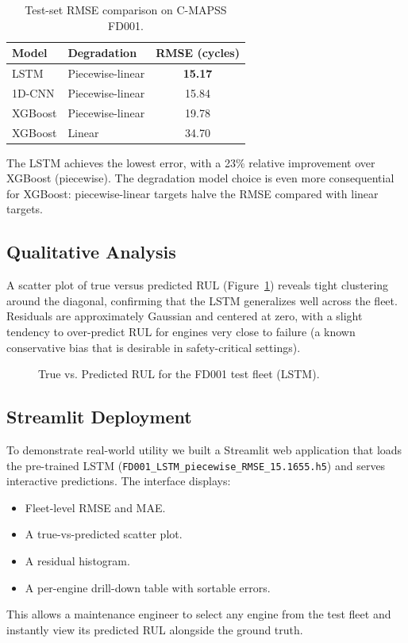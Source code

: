 \documentclass[11pt,a4paper]{article}
\begin{document}
\begin{table}[htbp]
\centering
\caption{Test-set RMSE comparison on C-MAPSS FD001.}
\label{tab:benchmark}
\begin{tabular}{@{}llc@{}}
\toprule
\textbf{Model} & \textbf{Degradation} & \textbf{RMSE (cycles)} \\
\midrule
LSTM           & Piecewise-linear     & \textbf{15.17} \\
1D-CNN         & Piecewise-linear     & 15.84 \\
XGBoost        & Piecewise-linear     & 19.78 \\
XGBoost        & Linear               & 34.70 \\
\bottomrule
\end{tabular}
\end{table}

The LSTM achieves the lowest error, with a 23\% relative improvement over XGBoost (piecewise). The degradation model choice is even more consequential for XGBoost: piecewise-linear targets halve the RMSE compared with linear targets.

\subsection{Qualitative Analysis}
A scatter plot of true versus predicted RUL (Figure~\ref{fig:scatter}) reveals tight clustering around the diagonal, confirming that the LSTM generalizes well across the fleet. Residuals are approximately Gaussian and centered at zero, with a slight tendency to over-predict RUL for engines very close to failure (a known conservative bias that is desirable in safety-critical settings).

\begin{figure}[htbp]
\centering
{}
\caption{True vs. Predicted RUL for the FD001 test fleet (LSTM).}
\label{fig:scatter}
\end{figure}

\subsection{Streamlit Deployment}
To demonstrate real-world utility we built a Streamlit web application that loads the pre-trained LSTM (\texttt{FD001\_LSTM\_piecewise\_RMSE\_15.1655.h5}) and serves interactive predictions. The interface displays:
\begin{itemize}
    \item Fleet-level RMSE and MAE.
    \item A true-vs-predicted scatter plot.
    \item A residual histogram.
    \item A per-engine drill-down table with sortable errors.
\end{itemize}
This allows a maintenance engineer to select any engine from the test fleet and instantly view its predicted RUL alongside the ground truth.
\end{document}
